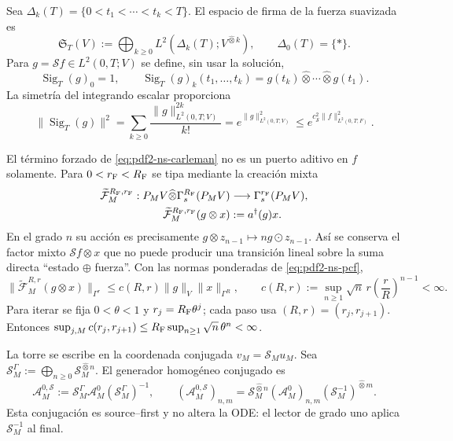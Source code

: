 Sea $\Delta_k(T)=\{0<t_1<\cdots<t_k<T\}$. El espacio de firma de la fuerza
suavizada es
\begin{equation}\label{eq:pdf2-ns-signature-space}
 \mathfrak S_T(V):=\bigoplus_{k\geq0}L^2(\Delta_k(T);V^{\widehat\otimes k}),
 \qquad \Delta_0(T)=\{*\}.
\end{equation}
Para $g=\mathscr Sf\in L^2(0,T;V)$ se define, sin usar la solución,
\begin{equation}\label{eq:pdf2-ns-force-signature}
 \operatorname{Sig}_T(g)_0=1,
 \qquad
 \operatorname{Sig}_T(g)_k(t_1,\ldots,t_k)
 =g(t_k)\widehat\otimes\cdots\widehat\otimes g(t_1).
\end{equation}
La simetría del integrando escalar proporciona
\begin{equation}\label{eq:pdf2-ns-signature-norm}
 \|\operatorname{Sig}_T(g)\|^2
 =\sum_{k\geq0}\frac{\|g\|_{L^2(0,T;V)}^{2k}}{k!}
 =e^{\|g\|_{L^2(0,T;V)}^2}
 \le e^{c_{\mathscr S}^2\|f\|_{L^2(0,T;F)}^2}.
\end{equation}

El término forzado de \eqref{eq:pdf2-ns-carleman} no es un puerto aditivo en
$f$ solamente. Para $0<r_{\rm F}<R_{\rm F}$ se tipa mediante la creación mixta
\begin{equation}\label{eq:pdf2-ns-mixed-creation}
 \begin{aligned}
 \widetilde{\mathcal F}^{R_{\rm F},r_{\rm F}}_M:
 P_MV\widehat\otimes\Gamma_s^{R_{\rm F}}(P_MV)
 &\longrightarrow\Gamma_s^{r_{\rm F}}(P_MV),\\
 \widetilde{\mathcal F}^{R_{\rm F},r_{\rm F}}_M(g\otimes x)
 &:=a^\dagger(g)x.
 \end{aligned}
\end{equation}
En el grado $n$ su acción es precisamente
$g\otimes z_{n-1}\mapsto n g\odot z_{n-1}$. Así se conserva el factor mixto
$\mathscr Sf\otimes x$ que no puede producir una transición lineal sobre la suma directa
``estado $\oplus$ fuerza''.
Con las normas ponderadas de \eqref{eq:pdf2-ns-pcf},
\begin{equation}\label{eq:pdf2-ns-creation-uniform}
 \|\widetilde{\mathcal F}^{R,r}_M(g\otimes x)\|_{\Gamma^r}
 \le c(R,r)\|g\|_V\|x\|_{\Gamma^R},
 \qquad
 c(R,r):=\sup_{n\ge1}\sqrt n\,r\left(\frac rR\right)^{n-1}<\infty.
\end{equation}
Para iterar se fija $0<\theta<1$ y $r_j=R_{\rm F}\theta^j$; cada paso usa
$(R,r)=(r_j,r_{j+1})$. Entonces
$\sup_{j,M}c(r_j,r_{j+1})\le
R_{\rm F}\sup_{n\ge1}\sqrt n\,\theta^n<\infty$.

La torre se escribe en la coordenada conjugada
$v_M=\mathscr S_Mu_M$. Sea
$\mathscr S_M^{\Gamma}:=\bigoplus_{n\ge0}
\mathscr S_M^{\widehat\otimes n}$. El generador homogéneo conjugado es
\begin{equation}\label{eq:pdf2-ns-conjugated-generator}
 \mathcal A^{0,\mathscr S}_{M}
 :=\mathscr S_M^{\Gamma}\mathcal A^0_M
   (\mathscr S_M^{\Gamma})^{-1},
 \qquad
 (\mathcal A^{0,\mathscr S}_{M})_{n,m}
 =\mathscr S_M^{\widehat\otimes n}
  (\mathcal A^0_M)_{n,m}
  (\mathscr S_M^{-1})^{\widehat\otimes m}.
\end{equation}
Esta conjugación es source--first y no altera la ODE: el lector de grado uno
aplica $\mathscr S_M^{-1}$ al final.

